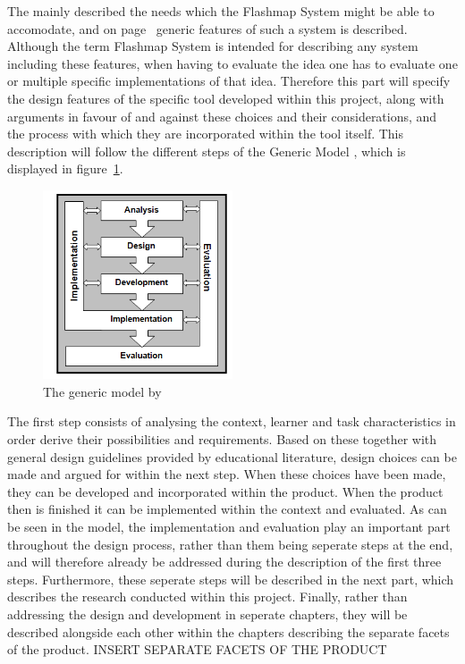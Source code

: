 The  mainly described the needs which the Flashmap System might be able to accomodate, and on page~\pageref{sec:flashmap} generic features of such a system is described. Although the term Flashmap System is intended for describing any system including these features, when having to evaluate the idea one has to evaluate one or multiple specific implementations of that idea. Therefore this part will specify the design features of the specific tool developed within this project, along with arguments in favour of and against these choices and their considerations, and the process with which they are incorporated within the tool itself. This description will follow the different steps of the Generic Model \cite{genericmodel}, which is displayed in figure~\ref{fig:genericmodel}.

\begin{figure}[h]
    \centering
    \includegraphics[width=0.5\textwidth]{img/genericmodel}
    \caption{The generic model by \protect{}\label{fig:genericmodel}}
\end{figure}

The first step consists of analysing the context, learner and task characteristics in order derive their possibilities and requirements. Based on these together with general design guidelines provided by educational literature, design choices can be made and argued for within the next step. When these choices have been made, they can be developed and incorporated within the product. When the product then is finished it can be implemented within the context and evaluated. As can be seen in the model, the implementation and evaluation play an important part throughout the design process, rather than them being seperate steps at the end, and will therefore already be addressed during the description of the first three steps. Furthermore, these seperate steps will be described in the next part, which describes the research conducted within this project. Finally, rather than addressing the design and development in seperate chapters, they will be described alongside each other within the chapters describing the separate facets of the product. INSERT SEPARATE FACETS OF THE PRODUCT
